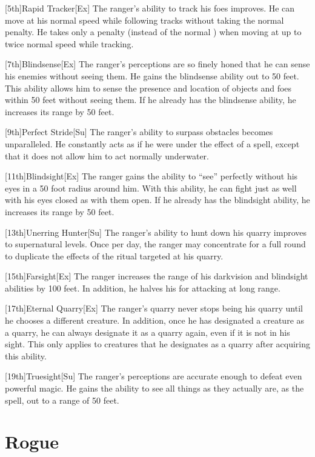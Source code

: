 [5th]{Rapid Tracker}[Ex]
The ranger's ability to track his foes improves.
He can move at his normal speed while following tracks without taking the normal  penalty.
He takes only a  penalty (instead of the normal ) when moving at up to twice normal speed while tracking.

[7th]{Blindsense}[Ex]
The ranger's perceptions are so finely honed that he can sense his enemies without seeing them.
He gains the blindsense ability out to 50 feet.
This ability allows him to sense the presence and location of objects and foes within 50 feet without seeing them.
If he already has the blindsense ability, he increases its range by 50 feet.

[9th]{Perfect Stride}[Su]
The ranger's ability to surpass obstacles becomes unparalleled.
He constantly acts as if he were under the effect of a  spell, except that it does not allow him to act normally underwater.

[11th]{Blindsight}[Ex]
The ranger gains the ability to ``see'' perfectly without his eyes in a 50 foot radius around him.
With this ability, he can fight just as well with his eyes closed as with them open.
If he already has the blindsight ability, he increases its range by 50 feet.

[13th]{Unerring Hunter}[Su]
The ranger's ability to hunt down his quarry improves to supernatural levels.
Once per day, the ranger may concentrate for a full round to duplicate the effects of the  ritual targeted at his quarry.

[15th]{Farsight}[Ex]
The ranger increases the range of his darkvision and blindsight abilities by 100 feet.
In addition, he halves his  for attacking at long range.

[17th]{Eternal Quarry}[Ex]
The ranger's quarry never stops being his quarry until he chooses a different creature.
In addition, once he has designated a creature as a quarry, he can always designate it as a quarry again, even if it is not in his sight.
This only applies to creatures that he designates as a quarry after acquiring this ability.

[19th]{Truesight}[Su]
The ranger's perceptions are accurate enough to defeat even powerful magic.
He gains the ability to see all things as they actually are, as the  spell, out to a range of 50 feet.

\section{Rogue}

